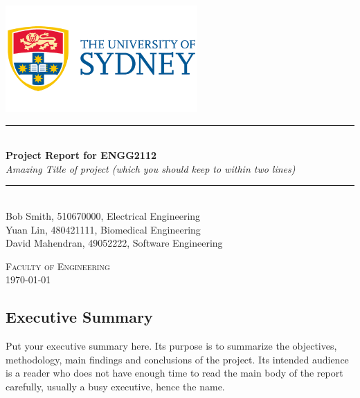 \documentclass[12pt,a4paper]{article}
\newcommand{\HRule}{\rule{\linewidth}{0.5mm}}
\begin{document}
	
	\begin{titlepage}
		\begin{center}
			
			\includegraphics[width=0.55\textwidth]{the-university-of-sydney-vector-logo.png}~\\[2cm]
			
			
			\HRule \\[0.4cm]
			{ \LARGE 
				\textbf{Project Report for ENGG2112}\\[0.4cm]
				\emph{Amazing Title of project (which you should keep to within two lines)}\\[0.4cm]
			}
			\HRule \\[1.5cm]
			
			
			
			{ \large
				Bob Smith, 510670000, Electrical Engineering \\[0.1cm]
				Yuan Lin, 480421111, Biomedical Engineering\\[0.1cm]
				David Mahendran, 49052222, Software Engineering\\[0.1cm]
			}
			
			\vfill
			
			\textsc{\large Faculty of Engineering}\\[0.4cm]
			
			
			{\large \today}
			
		\end{center}
	\end{titlepage}
	
	\begin{center}

	\subsection*{Executive Summary}
	\end{center}
	
	\noindent Put your executive summary here. Its purpose is to summarize the objectives, methodology, main findings and conclusions of the project. Its intended audience is a reader who does not have enough time to read the main body of the report carefully, usually a busy executive, hence the name.
	
\end{document}
